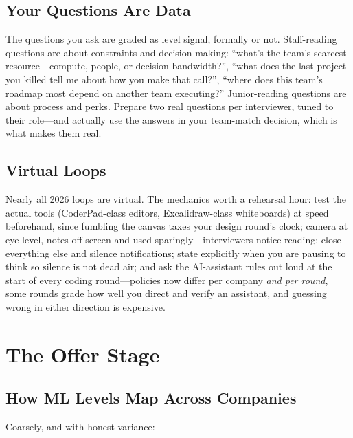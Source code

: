 \subsection{Your Questions Are Data}

The questions you ask are graded as level signal, formally or not. Staff-reading questions are about constraints and decision-making: ``what's the team's scarcest resource---compute, people, or decision bandwidth?'', ``what does the last project you killed tell me about how you make that call?'', ``where does this team's roadmap most depend on another team executing?'' Junior-reading questions are about process and perks. Prepare two real questions per interviewer, tuned to their role---and actually use the answers in your team-match decision, which is what makes them real.

\subsection{Virtual Loops}

Nearly all 2026 loops are virtual. The mechanics worth a rehearsal hour: test the actual tools (CoderPad-class editors, Excalidraw-class whiteboards) at speed beforehand, since fumbling the canvas taxes your design round's clock; camera at eye level, notes off-screen and used sparingly---interviewers notice reading; close everything else and silence notifications; state explicitly when you are pausing to think so silence is not dead air; and ask the AI-assistant rules out loud at the start of every coding round---policies now differ per company \textit{and per round}, some rounds grade how well you direct and verify an assistant, and guessing wrong in either direction is expensive.

\section{The Offer Stage}
\label{sec:offer_stage}

\subsection{How ML Levels Map Across Companies}

Coarsely, and with honest variance:

